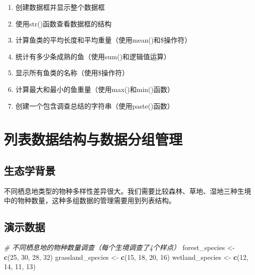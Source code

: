 \documentclass[
]{book}
\newenvironment{Shaded}{\begin{snugshade}}{\end{snugshade}}
\newcommand{\CommentTok}[1]{\textcolor[rgb]{0.56,0.35,0.01}{\textit{#1}}}
\newcommand{\DecValTok}[1]{\textcolor[rgb]{0.00,0.00,0.81}{#1}}
\newcommand{\FunctionTok}[1]{\textcolor[rgb]{0.13,0.29,0.53}{\textbf{#1}}}
\newcommand{\NormalTok}[1]{#1}
\newcommand{\OtherTok}[1]{\textcolor[rgb]{0.56,0.35,0.01}{#1}}
\begin{document}
\begin{enumerate}
\def\labelenumi{\arabic{enumi}.}
\item
  创建数据框并显示整个数据框
\item
  使用str()函数查看数据框的结构
\item
  计算鱼类的平均长度和平均重量（使用mean()和\$操作符）
\item
  统计有多少条成熟的鱼（使用sum()和逻辑值运算）
\item
  显示所有鱼类的名称（使用\$操作符）
\item
  计算最大和最小的鱼重量（使用max()和min()函数）
\item
  创建一个包含调查总结的字符串（使用paste()函数）
\end{enumerate}

\hypertarget{ux5217ux8868ux6570ux636eux7ed3ux6784ux4e0eux6570ux636eux5206ux7ec4ux7ba1ux7406}{%
\section{列表数据结构与数据分组管理}\label{ux5217ux8868ux6570ux636eux7ed3ux6784ux4e0eux6570ux636eux5206ux7ec4ux7ba1ux7406}}

\hypertarget{ux751fux6001ux5b66ux80ccux666f-3}{%
\subsection{生态学背景}\label{ux751fux6001ux5b66ux80ccux666f-3}}

不同栖息地类型的物种多样性差异很大。我们需要比较森林、草地、湿地三种生境中的物种数量，这种多组数据的管理需要用到列表结构。

\hypertarget{ux6f14ux793aux6570ux636e-3}{%
\subsection{演示数据}\label{ux6f14ux793aux6570ux636e-3}}

\begin{Shaded}
\begin{Highlighting}[]
\CommentTok{\# 不同栖息地的物种数量调查（每个生境调查了4个样点）}
\NormalTok{forest\_species }\OtherTok{\textless{}{-}} \FunctionTok{c}\NormalTok{(}\DecValTok{25}\NormalTok{, }\DecValTok{30}\NormalTok{, }\DecValTok{28}\NormalTok{, }\DecValTok{32}\NormalTok{)}
\NormalTok{grassland\_species }\OtherTok{\textless{}{-}} \FunctionTok{c}\NormalTok{(}\DecValTok{15}\NormalTok{, }\DecValTok{18}\NormalTok{, }\DecValTok{20}\NormalTok{, }\DecValTok{16}\NormalTok{)  }
\NormalTok{wetland\_species }\OtherTok{\textless{}{-}} \FunctionTok{c}\NormalTok{(}\DecValTok{12}\NormalTok{, }\DecValTok{14}\NormalTok{, }\DecValTok{11}\NormalTok{, }\DecValTok{13}\NormalTok{)}
\end{Highlighting}
\end{Shaded}
\end{document}
